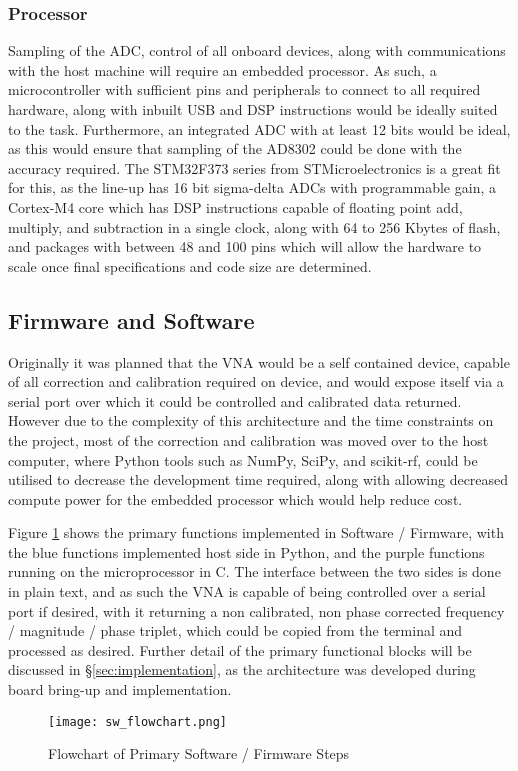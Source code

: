 \subsubsection{Processor}
Sampling of the ADC, control of all onboard devices, along with communications with the host machine will require an embedded processor. As such, a microcontroller with sufficient pins and peripherals to connect to all required hardware, along with inbuilt USB and DSP instructions would be ideally suited to the task. Furthermore, an integrated ADC with at least 12 bits would be ideal, as this would ensure that sampling of the AD8302 could be done with the accuracy required. The STM32F373 series from STMicroelectronics is a great fit for this, as the line-up has 16 bit sigma-delta ADCs with programmable gain, a Cortex-M4 core which has DSP instructions capable of floating point add, multiply, and subtraction in a single clock, along with 64 to 256 Kbytes of flash, and packages with between 48 and 100 pins which will allow the hardware to scale once final specifications and code size are determined. 

\subsection{Firmware and Software}
\label{subsec:firmware_software}
Originally it was planned that the VNA would be a self contained device, capable of all correction and calibration required on device, and would expose itself via a serial port over which it could be controlled and calibrated data returned. However due to the complexity of this architecture and the time constraints on the project, most of the correction and calibration was moved over to the host computer, where Python tools such as NumPy, SciPy, and scikit-rf, could be utilised to decrease the development time required, along with allowing decreased compute power for the embedded processor which would help reduce cost. 

Figure \ref{fig:sw_flowchart} shows the primary functions implemented in Software / Firmware, with the blue functions implemented host side in Python, and the purple functions running on the microprocessor in C. The interface between the two sides is done in plain text, and as such the VNA is capable of being controlled over a serial port if desired, with it returning a non calibrated, non phase corrected frequency / magnitude / phase triplet, which could be copied from the terminal and processed as desired. Further detail of the primary functional blocks will be discussed in \S \ref{sec:implementation}, as the architecture was developed during board bring-up and implementation. 

\begin{figure}[H]
	\centering
	\texttt{[image: sw\_flowchart.png]}
	\caption{Flowchart of Primary Software / Firmware Steps}
	\label{fig:sw_flowchart}
\end{figure}